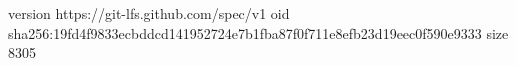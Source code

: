version https://git-lfs.github.com/spec/v1
oid sha256:19fd4f9833ecbddcd141952724e7b1fba87f0f711e8efb23d19eec0f590e9333
size 8305

